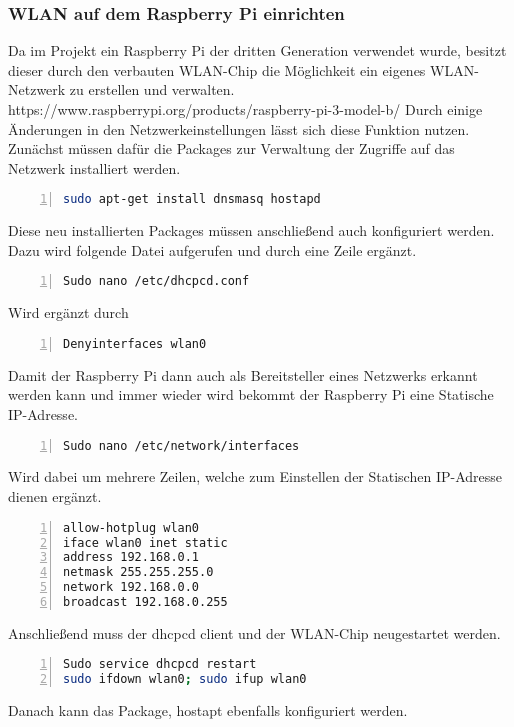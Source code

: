 \subsubsection{\ac{WLAN} auf dem Raspberry Pi einrichten}
Da im Projekt ein Raspberry Pi der dritten Generation verwendet wurde, besitzt dieser durch den verbauten \ac{WLAN}-Chip die Möglichkeit ein eigenes \ac{WLAN}-Netzwerk zu erstellen und verwalten. https://www.raspberrypi.org/products/raspberry-pi-3-model-b/ 
Durch einige Änderungen in den Netzwerkeinstellungen lässt sich diese Funktion nutzen.
Zunächst müssen dafür die Packages zur Verwaltung der Zugriffe auf das Netzwerk installiert werden.
\begin{lstlisting}[caption={Installation dnsmasq hostapd}, language={bash}, numbers=left]
sudo apt-get install dnsmasq hostapd
\end{lstlisting}
Diese neu installierten Packages müssen anschließend auch konfiguriert werden. Dazu wird folgende Datei aufgerufen und durch eine Zeile ergänzt.
\begin{lstlisting}[caption={Konfiguration DHCP Server}, language={bash}, numbers=left]
Sudo nano /etc/dhcpcd.conf
\end{lstlisting}
Wird ergänzt durch
\begin{lstlisting}[caption={Konfiguration DHCP Server}, language={bash}, numbers=left]
Denyinterfaces wlan0
\end{lstlisting}
Damit der Raspberry Pi dann auch als Bereitsteller eines Netzwerks erkannt werden kann und immer wieder wird bekommt der Raspberry Pi eine Statische \ac{IP}-Adresse. 
\begin{lstlisting}[caption={Konfiguration Interfaces}, language={bash}, numbers=left]
Sudo nano /etc/network/interfaces
\end{lstlisting}
Wird dabei um mehrere Zeilen, welche zum Einstellen der Statischen \ac{IP}-Adresse dienen ergänzt.
\begin{lstlisting}[caption={Konfiguration Interfaces}, language={bash}, numbers=left]
allow-hotplug wlan0
iface wlan0 inet static
address 192.168.0.1
netmask 255.255.255.0
network 192.168.0.0
broadcast 192.168.0.255
\end{lstlisting}
Anschließend muss der dhcpcd client und der \ac{WLAN}-Chip neugestartet werden.
\begin{lstlisting}[caption={Konfiguration Interfaces}, language={bash}, numbers=left]
Sudo service dhcpcd restart
sudo ifdown wlan0; sudo ifup wlan0
\end{lstlisting}
Danach kann das Package, hostapt ebenfalls konfiguriert werden. 
